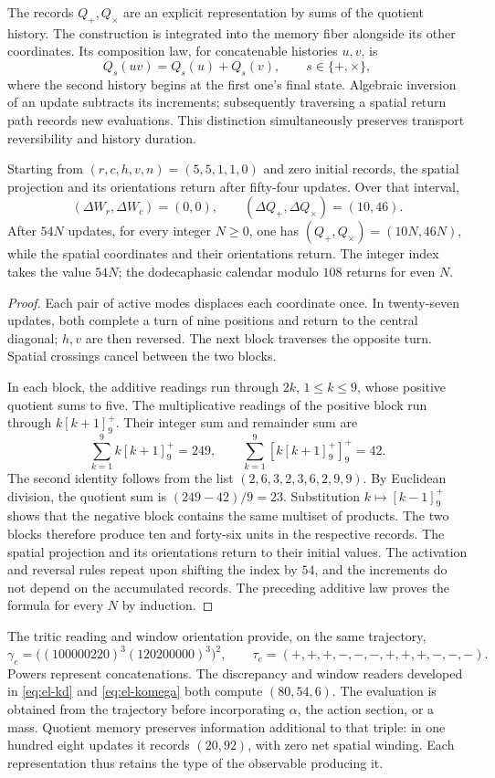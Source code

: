 The records \(Q_+,Q_\times\) are an explicit representation by sums
of the quotient history. The construction is integrated into the memory
fiber alongside its other coordinates. Its composition law,
for concatenable histories \(u,v\), is
\[
 Q_s(uv)=Q_s(u)+Q_s(v),\qquad s\in\{+,\times\},
\]
where the second history begins at the first one's final state.
Algebraic inversion of an update subtracts its increments;
subsequently traversing a spatial return path records
new evaluations. This distinction simultaneously preserves
transport reversibility and history duration.

\begin{proposition}
\label{ii:electron-memoria-retorno}
Starting from \((r,c,h,v,n)=(5,5,1,1,0)\) and zero initial records, the
spatial projection and its orientations return after fifty-four
updates. Over that interval,
\[
 (\Delta W_r,\Delta W_c)=(0,0),\qquad
 (\Delta Q_+,\Delta Q_\times)=(10,46).
\]
After \(54N\) updates, for every integer \(N\geq0\),
one has \((Q_+,Q_\times)=(10N,46N)\), while the spatial
coordinates and their orientations return. The integer index takes the value
\(54N\); the dodecaphasic calendar modulo \(108\) returns for
even \(N\).
\end{proposition}
\begin{proof}
Each pair of active modes displaces each coordinate once. In
twenty-seven updates, both complete a turn of nine
positions and return to the central diagonal; \(h,v\) are then
reversed. The next block traverses the opposite turn. Spatial
crossings cancel between the two blocks.

In each block, the additive readings run through \(2k\),
\(1\leq k\leq9\), whose positive quotient sums to five. The
multiplicative readings of the positive block run through
\(k[k+1]^+_9\). Their integer sum and remainder sum are
\[
 \sum_{k=1}^9 k[k+1]^+_9=249,\qquad
 \sum_{k=1}^9[k[k+1]^+_9]^+_9=42.
\]
The second identity follows from the list
\((2,6,3,2,3,6,2,9,9)\). By Euclidean division,
the quotient sum is \((249-42)/9=23\). Substitution
\(k\mapsto[k-1]^+_9\) shows that the negative block contains
the same multiset of products. The two blocks therefore produce
ten and forty-six units in the respective records.
The spatial projection and its orientations return to their initial
values. The activation and reversal rules repeat upon
shifting the index by \(54\), and the increments do not depend on
the accumulated records. The preceding additive law
proves the formula for every \(N\) by induction.
\end{proof}

The tritic reading and window orientation provide, on
the same trajectory,
\[
 \gamma_e=\bigl((100000220)^3(120200000)^3\bigr)^2,\qquad
 \tau_e=(+,+,+,-,-,-,+,+,+,-,-,-).
\]
Powers represent concatenations. The discrepancy
and window readers developed in
\eqref{eq:el-kd} and \eqref{eq:el-komega} both compute
\((80,54,6)\). The evaluation is obtained from the trajectory before
incorporating \(\alpha\), the action section, or a mass.
Quotient memory preserves information additional to that triple:
in one hundred eight updates it records \((20,92)\), with
zero net spatial winding. Each representation thus retains the
type of the observable producing it.
